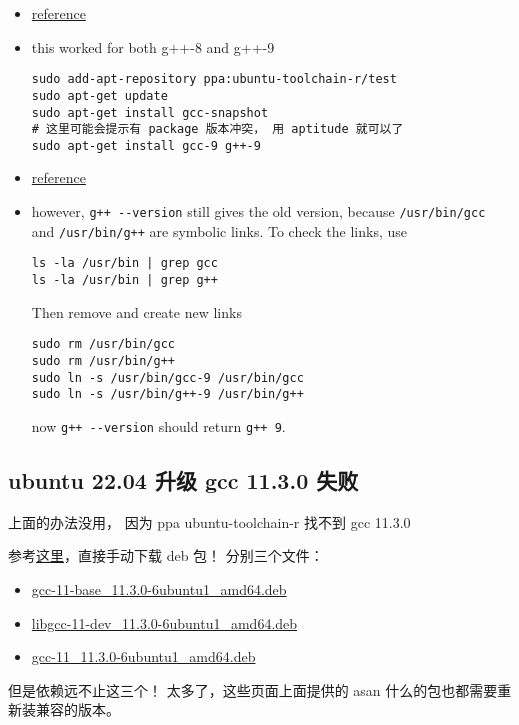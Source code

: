 
\begin{itemize}
\item \href{https://askubuntu.com/questions/815331/updating-to-latest-gcc-and-g-on-ubuntu-16-04}{reference}
\item this worked for both g++-8 and g++-9
\begin{lstlisting}[language=none]
sudo add-apt-repository ppa:ubuntu-toolchain-r/test
sudo apt-get update
sudo apt-get install gcc-snapshot
# 这里可能会提示有 package 版本冲突， 用 aptitude 就可以了
sudo apt-get install gcc-9 g++-9
\end{lstlisting}
\item \href{https://askubuntu.com/questions/26498/how-to-choose-the-default-gcc-and-g-version}{reference}
\item however, \verb`g++ --version` still gives the old version, because \verb`/usr/bin/gcc` and \verb`/usr/bin/g++` are symbolic links. To check the links, use
\begin{lstlisting}[language=none]
ls -la /usr/bin | grep gcc
ls -la /usr/bin | grep g++
\end{lstlisting}
Then remove and create new links
\begin{lstlisting}[language=none]
sudo rm /usr/bin/gcc
sudo rm /usr/bin/g++
sudo ln -s /usr/bin/gcc-9 /usr/bin/gcc
sudo ln -s /usr/bin/g++-9 /usr/bin/g++
\end{lstlisting}
now \verb`g++ --version` should return \verb`g++ 9`.
\end{itemize}

\subsection{ubuntu 22.04 升级 gcc 11.3.0 失败}
上面的办法没用， 因为 ppa ubuntu-toolchain-r 找不到 gcc 11.3.0

参考\href{https://askubuntu.com/questions/1481354/install-a-specific-gcc-version-to-match-the-version-the-kernel-was-compiled-with}{这里}，直接手动下载 deb 包！ 分别三个文件：
\begin{itemize}
\item \href{http://mirrors.kernel.org/ubuntu/pool/main/g/gcc-11/gcc-11-base_11.3.0-6ubuntu1_amd64.deb}{gcc-11-base_11.3.0-6ubuntu1_amd64.deb}
\item \href{http://mirrors.kernel.org/ubuntu/pool/main/g/gcc-11/libgcc-11-dev_11.3.0-6ubuntu1_amd64.deb}{libgcc-11-dev_11.3.0-6ubuntu1_amd64.deb}
\item \href{http://mirrors.kernel.org/ubuntu/pool/universe/g/gcc-11/gcc-11_11.3.0-6ubuntu1_amd64.deb}{gcc-11_11.3.0-6ubuntu1_amd64.deb}
\end{itemize}

但是依赖远不止这三个！ 太多了，这些页面上面提供的 asan 什么的包也都需要重新装兼容的版本。
